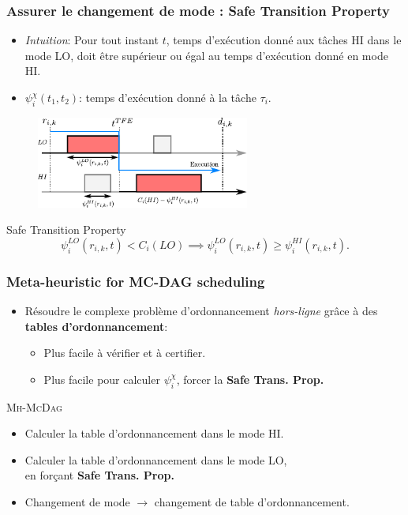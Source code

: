 \documentclass[xcolor=table]{beamer}
\begin{document}
\begin{frame}
	\frametitle{Assurer le changement de mode : Safe Transition Property}
	\begin{itemize}
		\item \emph{Intuition}: Pour tout instant $t$, temps d'exécution donné aux tâches HI dans le 
		mode LO, 
		doit être supérieur ou égal au temps d'exécution donné en mode HI.
		\item $\psi_i^{\chi}(t_1, t_2)$: temps d'exécution donné à la tâche $\tau_i$.
	\end{itemize}
	
	\begin{figure}
		\includegraphics[width=7cm]{figs/proof_case3.pdf}
	\end{figure}
	
	\begin{exampleblock}{Safe Transition Property}
		\begin{equation}
		\psi_i^{LO}(r_{i,k}, t) < C_i(LO) \implies \psi_i^{LO}(r_{i,k}, t) 
		\geq \psi_i^{HI}(r_{i,k},t).
		\label{eq:condswitch}
		\end{equation}
	\end{exampleblock}
\end{frame}


\begin{frame}
	\frametitle{Meta-heuristic for MC-DAG scheduling}
	
	\begin{itemize}
		\item Résoudre le complexe problème d'ordonnancement \emph{hors-ligne} grâce à des 
		\textbf{tables 
		d'ordonnancement}:
		\begin{itemize}
			\item Plus facile à vérifier et à certifier.
			\item Plus facile pour calculer $\psi_i^\chi$, forcer la \textbf{Safe Trans. Prop.}
		\end{itemize}
	\end{itemize}
	
	\begin{exampleblock}{\textsc{Mh-McDag}}
		\begin{itemize}
			\item Calculer la table d'ordonnancement dans le mode HI.
			\item Calculer la table d'ordonnancement dans le mode LO,\\
			en forçant  \textbf{Safe Trans. Prop.}
			\item Changement de mode $\rightarrow$ changement de table d'ordonnancement.
		\end{itemize}
	\end{exampleblock}
\end{frame}
\end{document}
